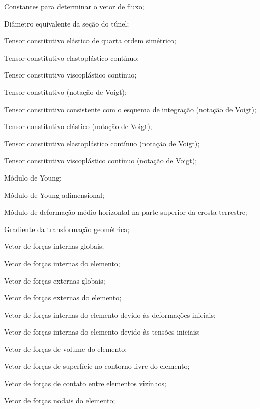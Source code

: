 \item[$C_1, C_2, C_3$]	Constantes para determinar o vetor de fluxo;
\item[$D$]				Diâmetro equivalente da seção do túnel;
\item[$\Dllll$] Tensor constitutivo elástico de quarta ordem simétrico;
\item[$\Dllll^{ep}$] Tensor constitutivo elastoplástico contínuo;
\item[$\Dllll^{vp}$] Tensor constitutivo viscoplástico contínuo;
\item[$\Dll$] Tensor constitutivo (notação de Voigt);
\item[$\Dll^{alg}$] Tensor constitutivo consistente com o esquema de integração (notação de Voigt);
\item[$\Dll^{e}$] Tensor constitutivo elástico (notação de Voigt);
\item[$\Dll^{ep}$] Tensor constitutivo elastoplástico contínuo (notação de Voigt);
\item[$\Dll^{vp}$] Tensor constitutivo viscoplástico contínuo (notação de Voigt);
\item[$E$]				Módulo de Young;
\item[$E^*$]			Módulo de Young adimensional;
\item[$E_h$]			Módulo de deformação médio horizontal na parte superior da crosta terrestre;
\item[$\Fll$]			Gradiente da transformação geométrica;
\item[$\Fl_{int}$]			Vetor de forças internas globais;
\item[$\Fl_{int_e}$]			Vetor de forças internas do elemento;
\item[$\Fl_{ext}$]			Vetor de forças externas globais;
\item[$\Fl_{ext_e}$]			Vetor de forças externas do elemento;
\item[$\Fl_{\varepsilon_{0_e}}$]	Vetor de forças internas do elemento devido às deformações iniciais;
\item[$\Fl_{\sigma_{0_e}}$]	Vetor de forças internas do elemento devido às tensões iniciais;
\item[$\Fl_{V_e}$]	Vetor de forças de volume do elemento;
\item[$\Fl_{S_e}$]	Vetor de forças de superfície no contorno livre do elemento;
\item[$\Fl_{C_e}$]	Vetor de forças de contato entre elementos vizinhos;
\item[$\Fl_{N_e}$]	Vetor de forças nodais do elemento;

